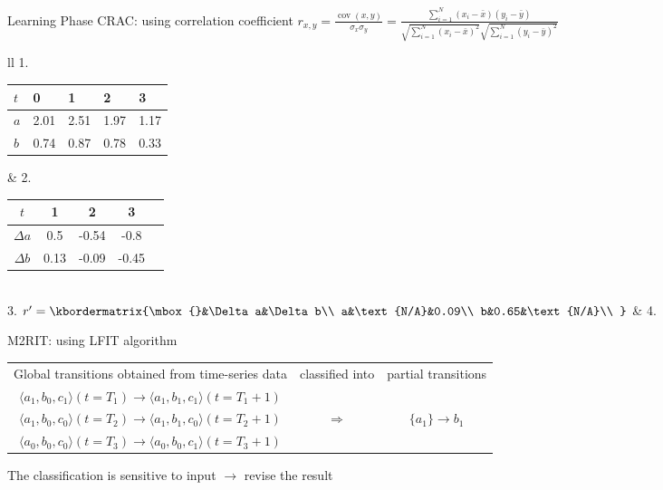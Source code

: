 \documentclass[8pt]{beamer}
\begin{document}
\begin{frame}{Learning Phase}
CRAC: using correlation coefficient $r_{x,y}={\frac {\operatorname {cov} (x,y)}{\sigma _{x}\sigma _{y}}}$\pause$={\frac {\sum _{i=1}^{N}(x_{i}-{\bar {x}})(y_{i}-{\bar {y}})}{{\sqrt {\sum _{i=1}^{N}(x_{i}-{\bar {x}})^{2}}}{\sqrt {\sum _{i=1}^{N}(y_{i}-{\bar {y}})^{2}}}}}$

\pause
\vspace{0.2cm}
\begin{tabular}{ll}
1.\begin{tabular}{l|*{4}{l}}
$t$&0&1&2&3\\
\hline
$a$&2.01&2.51&1.97&1.17\\
$b$&0.74&0.87&0.78&0.33\\
\end{tabular}   
\pause
& 
2.
\begin{tabular}{c|c*{3}{S}}
$t$&1&2&3\\
\hline
$\Delta a$&0.5&-0.54&-0.8\\
$\Delta b$&0.13&-0.09&-0.45\\
\end{tabular}
\pause
\\
3.
$r'=\kbordermatrix{\mbox{}&\Delta a&\Delta b\\
a&\text{N/A}&0.09\\
b&0.65&\text{N/A}\\
}$ 
\pause
&
4.
\end{tabular}

\vspace{1.2cm}
\pause

M2RIT: using LFIT algorithm

\vspace{0.2cm}
\begin{tabular}{ccc}
    Global transitions obtained from time-series data & classified into & partial transitions\\
    $\langle a_1,b_0,c_1\rangle(t=T_1)\to \langle a_1,b_1,c_1\rangle(t=T_1+1)$&&\\
    $\langle a_1,b_0,c_0\rangle(t=T_2)\to \langle a_1,b_1,c_0\rangle(t=T_2+1)$&$\Longrightarrow$&$\{a_1\}\to b_1$\\
    $\langle a_0,b_0,c_0\rangle(t=T_3)\to \langle a_0,b_0,c_1\rangle(t=T_3+1)$&&
\end{tabular}

\vspace{0.2cm}
\pause
The classification is sensitive to input $\to$ revise the result
\end{frame}
\end{document}
